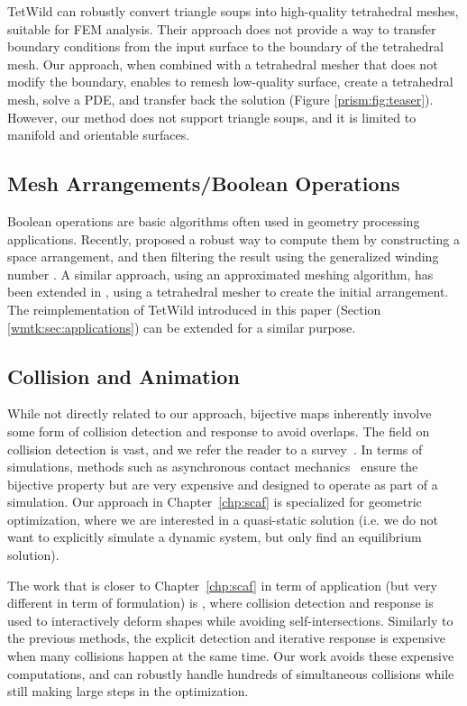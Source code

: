 TetWild \cite{hu2018tetrahedral,Hu:2019:fTetWild}
can robustly convert triangle soups into high-quality tetrahedral meshes, suitable for FEM analysis. Their approach does not provide a way to transfer boundary conditions from the input surface to the boundary of the tetrahedral mesh. Our approach, when combined with a tetrahedral mesher that does not modify the boundary, enables to remesh low-quality surface, create a tetrahedral mesh, solve a PDE, and transfer back the solution (Figure \ref{prism:fig:teaser}). However, our method does not support triangle soups, and it is limited to manifold and orientable surfaces.


\subsection{Mesh Arrangements/Boolean Operations} 

Boolean operations are basic algorithms often used in geometry processing applications. Recently, \cite{zhou2016mesh} proposed a robust way to compute them by constructing a space arrangement, and then filtering the result using the generalized winding number \cite{Jacobson:2013}. A similar approach, using an approximated meshing algorithm, has been extended in \cite{Hu:2019:fTetWild}, using a tetrahedral mesher to create the initial arrangement. The reimplementation of TetWild introduced in this paper (Section \ref{wmtk:sec:applications}) can be extended for a similar purpose.

\subsection{Collision and Animation}
While not directly related to our approach, bijective maps inherently  involve some form of collision detection and response to avoid overlaps.  The field on collision detection is vast, and we refer the reader to a survey~\cite{jimenez:2001}. 
In terms of simulations, methods such as asynchronous contact mechanics~\cite{Harmon:2009,harmon2010robust,Ainsley:2012} ensure the bijective property but are very expensive and designed to operate as part of a simulation. Our approach in Chapter~\ref{chp:scaf} is specialized for geometric optimization, where we are interested in a  quasi-static solution (i.e. we do not want to explicitly simulate a dynamic system, but only find an equilibrium solution).

The work that is closer to Chapter~\ref{chp:scaf} in term of application (but very different in term of formulation) is \cite{Harmon:2011}, where collision detection and response is used to interactively deform shapes while avoiding self-intersections. Similarly to the previous methods, the explicit detection and iterative response is expensive when many collisions happen at the same time.  Our work avoids these expensive computations, and can robustly handle hundreds of simultaneous collisions while still making large steps in the optimization.

